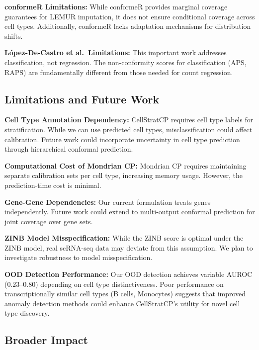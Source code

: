 \documentclass{article}
\begin{document}
\textbf{conformeR Limitations:} While conformeR provides marginal coverage guarantees for LEMUR imputation, it does not ensure conditional coverage across cell types. Additionally, conformeR lacks adaptation mechanisms for distribution shifts.

\textbf{L{\'o}pez-De-Castro et al.~Limitations:} This important work addresses classification, not regression. The non-conformity scores for classification (APS, RAPS) are fundamentally different from those needed for count regression.

\subsection{Limitations and Future Work}

\textbf{Cell Type Annotation Dependency:} CellStratCP requires cell type labels for stratification. While we can use predicted cell types, misclassification could affect calibration. Future work could incorporate uncertainty in cell type prediction through hierarchical conformal prediction.

\textbf{Computational Cost of Mondrian CP:} Mondrian CP requires maintaining separate calibration sets per cell type, increasing memory usage. However, the prediction-time cost is minimal.

\textbf{Gene-Gene Dependencies:} Our current formulation treats genes independently. Future work could extend to multi-output conformal prediction for joint coverage over gene sets.

\textbf{ZINB Model Misspecification:} While the ZINB score is optimal under the ZINB model, real scRNA-seq data may deviate from this assumption. We plan to investigate robustness to model misspecification.

\textbf{OOD Detection Performance:} Our OOD detection achieves variable AUROC ($0.23$--$0.80$) depending on cell type distinctiveness. Poor performance on transcriptionally similar cell types (B cells, Monocytes) suggests that improved anomaly detection methods could enhance CellStratCP's utility for novel cell type discovery.

\subsection{Broader Impact}
\end{document}
